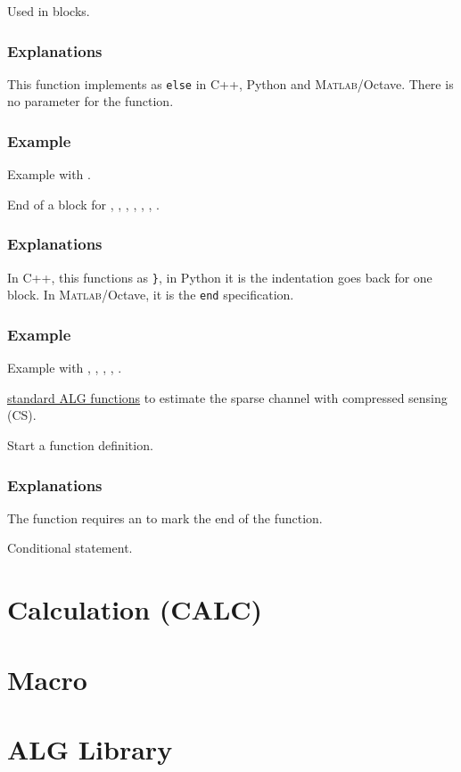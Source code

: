 Used in  blocks.
\subsubsection*{Explanations}
This function implements as \texttt{else} in C++, Python and \textsc{Matlab}/Octave.
There is no parameter for the  function.
\subsubsection*{Example}
Example with .

End of a block for , , , , , , .
\subsubsection*{Explanations}
In C++, this functions as \texttt{\}},
in Python it is the indentation goes back for one block.
In \textsc{Matlab}/Octave, it is the \texttt{end} specification.
\subsubsection*{Example}
Example with , , , , .

 \hyperref[d:sec:alg_lib]{standard ALG functions} to estimate the
sparse channel with compressed sensing (CS).

Start a function definition.
\subsubsection*{Explanations}
The function requires an  to mark the end of the function.

Conditional statement.

\section{Calculation (CALC)}\label{d:sec:calc}

\section{Macro}

\section{ALG Library}\label{d:sec:alg_lib}
